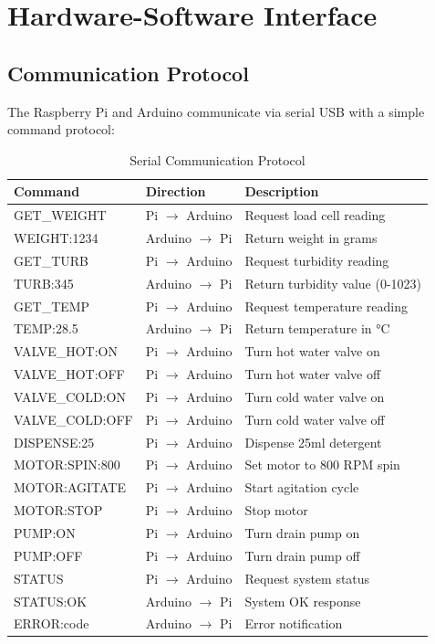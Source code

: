 \section{Hardware-Software Interface}

\subsection{Communication Protocol}

The Raspberry Pi and Arduino communicate via serial USB with a simple command protocol:

\begin{table}[H]
\centering
\caption{Serial Communication Protocol}
\label{tab:protocol}
\begin{tabular}{|l|l|p{5.5cm}|}
\hline
\textbf{Command} & \textbf{Direction} & \textbf{Description} \\
\hline
GET\_WEIGHT & Pi $\rightarrow$ Arduino & Request load cell reading \\
WEIGHT:1234 & Arduino $\rightarrow$ Pi & Return weight in grams \\
GET\_TURB & Pi $\rightarrow$ Arduino & Request turbidity reading \\
TURB:345 & Arduino $\rightarrow$ Pi & Return turbidity value (0-1023) \\
GET\_TEMP & Pi $\rightarrow$ Arduino & Request temperature reading \\
TEMP:28.5 & Arduino $\rightarrow$ Pi & Return temperature in °C \\
VALVE\_HOT:ON & Pi $\rightarrow$ Arduino & Turn hot water valve on \\
VALVE\_HOT:OFF & Pi $\rightarrow$ Arduino & Turn hot water valve off \\
VALVE\_COLD:ON & Pi $\rightarrow$ Arduino & Turn cold water valve on \\
VALVE\_COLD:OFF & Pi $\rightarrow$ Arduino & Turn cold water valve off \\
DISPENSE:25 & Pi $\rightarrow$ Arduino & Dispense 25ml detergent \\
MOTOR:SPIN:800 & Pi $\rightarrow$ Arduino & Set motor to 800 RPM spin \\
MOTOR:AGITATE & Pi $\rightarrow$ Arduino & Start agitation cycle \\
MOTOR:STOP & Pi $\rightarrow$ Arduino & Stop motor \\
PUMP:ON & Pi $\rightarrow$ Arduino & Turn drain pump on \\
PUMP:OFF & Pi $\rightarrow$ Arduino & Turn drain pump off \\
STATUS & Pi $\rightarrow$ Arduino & Request system status \\
STATUS:OK & Arduino $\rightarrow$ Pi & System OK response \\
ERROR:code & Arduino $\rightarrow$ Pi & Error notification \\
\hline
\end{tabular}
\end{table}

